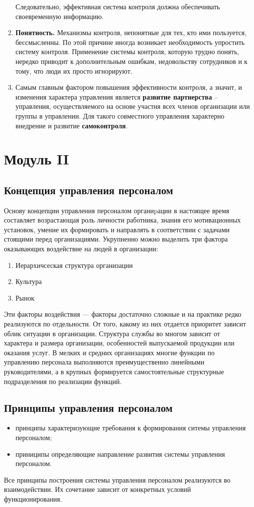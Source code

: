 \documentclass[a4paper,12pt,oneside,final]{extarticle}
\numberwithin{equation}{section}
\begin{document}
\begin{enumerate}
	Следовательно, эффективная система контроля должна обеспечивать своевременную информацию.
	\item \textbf{Понятность.} Механизмы контроля, непонятные для тех, кто ими пользуется, бессмысленны. 
	По этой причине иногда возникает необходимость упростить систему контроля. 
	Применение системы контроля, которую трудно понять, нередко приводит к дополнительным ошибкам, недовольству сотрудников и к тому, что люди их просто игнорируют.
	\item Самым главным фактором повышения эффективности контроля, а значит, и изменения характера управления является \textbf{развитие партнерства} – управления, осуществляемого на основе участия всех членов организации или группы в управлении.
	 Для такого совместного управления характерно внедрение и развитие \textbf{самоконтроля}.
\end{enumerate}

%
%
\section{Модуль II}
\subsection{Концепция управления персоналом}
Основу концепции управления персоналом органиpации в настоящее время составляет возрастающая роль личности работника, знания его мотивационных установок, умение их формировать и направлять в соответствии с задачами стоящими перед организациями. 
Укрупненно можно выделить три фактора оказывающих воздействие на людей в организации:
\begin{enumerate}
	\item Иерархичсеская структура организации
	\item Культура
	\item Рынок
\end{enumerate}
Эти факторы воздействия --- факторы достаточно сложные и на практике редко реализуются по отдельности. 
От того, какому из них отдается приоритет зависит облик ситуации в организации.
Структура службы во многом зависит от характера и размера организации, особенностей выпускаемой продукции или оказания услуг.
В мелких и средних организациях многие функции по управлению персонала выполняются преимущественно линейными руководителями, а в крупных формируется самостоятельные структурные подразделения по реализации функций.

\subsection{Принципы управления персоналом}
\begin{itemize}
	\item принципы характеризующие требования к формирования ситемы управления персоналом;
	\item приниципы определяющие направление развития системы управления персоналом.
\end{itemize}
Все принципы построения системы управления персоналом реализуются во взаимодействии. Их сочетание зависит от конкретных условий функционирования.
\end{document}
